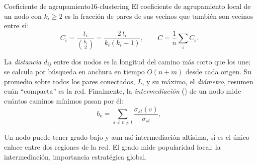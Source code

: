 \begin{definicion}{Coeficiente de agrupamiento}{16-clustering}
El coeficiente de agrupamiento local de un nodo con $k_i\ge2$ es la fracción de pares de sus vecinos que también son vecinos entre sí:
\begin{equation}\label{eq:16-clustering}
C_i=\frac{t_i}{\binom{k_i}{2}}=\frac{2\,t_i}{k_i(k_i-1)},\qquad C=\frac{1}{n}\sum_i C_i .
\end{equation}
\end{definicion}
\begin{simbolos}
\end{simbolos}

La \emph{distancia} $d_{ij}$ entre dos nodos es la longitud del camino más corto que los une; se calcula por búsqueda en anchura en tiempo $O(n+m)$ desde cada origen. Su promedio sobre todos los pares conectados, $L$, y su máximo, el \emph{diámetro}, resumen cuán ``compacta'' es la red. Finalmente, la \emph{intermediación} () de un nodo mide cuántos caminos mínimos pasan por él:
\begin{equation}\label{eq:16-betweenness}
b_v=\sum_{s\neq v\neq t}\frac{\sigma_{st}(v)}{\sigma_{st}},
\end{equation}
\begin{simbolos}
\end{simbolos}
Un nodo puede tener grado bajo y aun así intermediación altísima, si es el único enlace entre dos regiones de la red. El grado mide popularidad local; la intermediación, importancia estratégica global.

